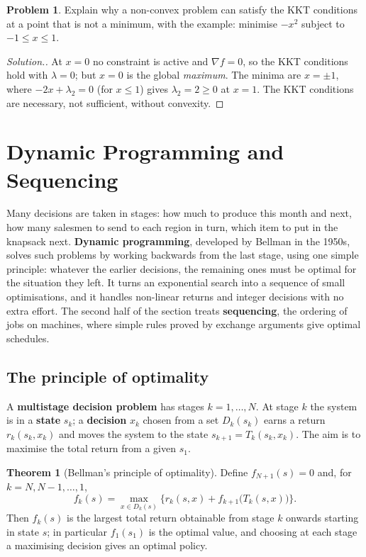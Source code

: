 \documentclass[11pt,a4paper]{article}
\numberwithin{equation}{section}
\theoremstyle{definition}
\newtheorem{thm}{Theorem}[subsection]
\newtheorem{problemx}{Problem}[subsection]
\newenvironment{problem}{\begin{problemx}}{\end{problemx}}
\newenvironment{solution}
  {\renewcommand{\qedsymbol}{}\begin{proof}[\textit{Solution}.]}
  {\end{proof}}
\begin{document}
\begin{problem}
Explain why a non-convex problem can satisfy the KKT conditions at a point that is not a minimum, with the example: minimise $-x^2$ subject to $-1 \leq x \leq 1$.
\end{problem}

\begin{solution}
At $x = 0$ no constraint is active and $\nabla f = 0$, so the KKT conditions hold with $\lambda = 0$; but $x = 0$ is the global \emph{maximum}. The minima are $x = \pm1$, where $-2x + \lambda_2 = 0$ (for $x \leq 1$) gives $\lambda_2 = 2 \geq 0$ at $x = 1$. The KKT conditions are necessary, not sufficient, without convexity.
\end{solution}

\section{Dynamic Programming and Sequencing}
\label{sec:dp}

Many decisions are taken in stages: how much to produce this month and next, how many salesmen to send to each region in turn, which item to put in the knapsack next. \textbf{Dynamic programming}, developed by Bellman in the 1950s, solves such problems by working backwards from the last stage, using one simple principle: whatever the earlier
decisions, the remaining ones must be optimal for the situation they left. It turns an exponential search into a sequence of small optimisations, and it handles non-linear returns and integer decisions with no extra effort. The second half of the section treats \textbf{sequencing}, the ordering of jobs on machines, where simple rules proved by exchange arguments give optimal schedules.

\subsection{The principle of optimality}
\label{ssec:bellman}

A \textbf{multistage decision problem} has stages $k = 1, \ldots, N$. At stage $k$ the system is in a \textbf{state} $s_k$; a \textbf{decision} $x_k$ chosen from a set $D_k(s_k)$ earns a return $r_k(s_k, x_k)$ and moves the system to the state $s_{k + 1} = T_k(s_k, x_k)$. The aim is to maximise the total return from a given $s_1$.

\begin{thm}[Bellman's principle of optimality]
\label{thm:bellman}
Define $f_{N + 1}(s) = 0$ and, for $k = N, N - 1, \ldots, 1$,
\[
f_k(s) = \max_{x \in D_k(s)}\bigl\{r_k(s, x) + f_{k + 1}\bigl(T_k(s, x)\bigr)\bigr\} .
\]
Then $f_k(s)$ is the largest total return obtainable from stage $k$ onwards starting in state $s$; in particular $f_1(s_1)$ is the optimal value, and choosing at each stage a maximising decision gives an optimal policy.
\end{thm}
\end{document}
